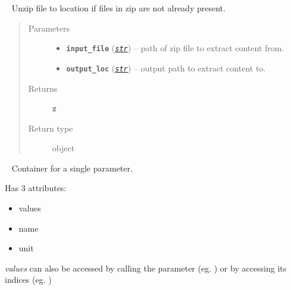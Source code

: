 \documentclass[letterpaper,10pt,english]{sphinxhowto}
\begin{document}

\begin{fulllineitems}
\label{swtools_doc:swtools.unzip_file}~\label{swtools_doc:unzip-file}
Unzip file to location if files in zip are not already present.
\begin{quote}\begin{description}
\item[{Parameters}] \leavevmode\begin{itemize}
\item {} 
\textbf{\texttt{input\_file}} (\href{https://docs.python.org/library/functions.html\#str}{\emph{\texttt{str}}}) -- path of zip file to extract content from.

\item {} 
\textbf{\texttt{output\_loc}} (\href{https://docs.python.org/library/functions.html\#str}{\emph{\texttt{str}}}) -- output path to extract content to.

\end{itemize}

\item[{Returns}] \leavevmode
\textbf{z}

\item[{Return type}] \leavevmode
{} object

\end{description}\end{quote}

\end{fulllineitems}


\begin{fulllineitems}
\label{swtools_doc:swtools.Parameter}~\label{swtools_doc:parameter}
Container for a single parameter.

Has 3 attributes:
\begin{itemize}
\item {} 
values

\item {} 
name

\item {} 
unit

\end{itemize}

\emph{values} can also be accessed by calling the parameter
(eg. ) or by accessing its indices (eg. )

\end{fulllineitems}
\end{document}
